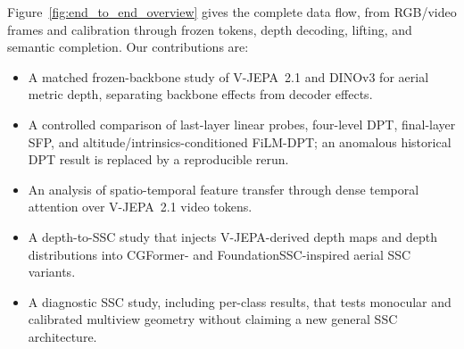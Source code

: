 Figure~\ref{fig:end_to_end_overview} gives the complete data flow, from RGB/video frames and calibration through frozen tokens, depth decoding, lifting, and semantic completion. Our contributions are:
\begin{itemize}
    \item A matched frozen-backbone study of V-JEPA~2.1 and DINOv3 for aerial metric depth, separating backbone effects from decoder effects.
    \item A controlled comparison of last-layer linear probes, four-level DPT, final-layer SFP, and altitude/intrinsics-conditioned FiLM-DPT; an anomalous historical DPT result is replaced by a reproducible rerun.
    \item An analysis of spatio-temporal feature transfer through dense temporal attention over V-JEPA~2.1 video tokens.
    \item A depth-to-SSC study that injects V-JEPA-derived depth maps and depth distributions into CGFormer- and FoundationSSC-inspired aerial SSC variants.
    \item A diagnostic SSC study, including per-class results, that tests monocular and calibrated multiview geometry without claiming a new general SSC architecture.
\end{itemize}

